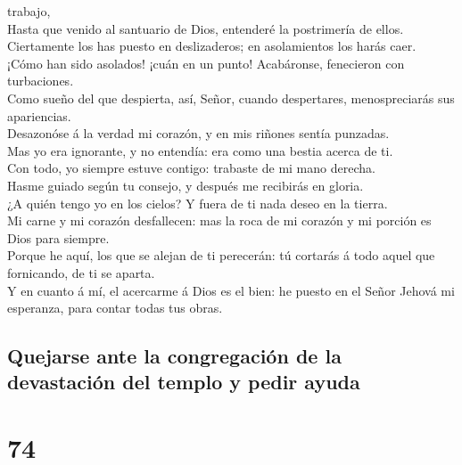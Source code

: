 trabajo,\\
 Hasta que venido al santuario de Dios, entenderé la
postrimería de ellos.\\
 Ciertamente los has puesto en deslizaderos; en
asolamientos los harás caer.\\
 ¡Cómo han sido asolados! ¡cuán en un punto! Acabáronse,
fenecieron con turbaciones.\\
 Como sueño del que despierta, así, Señor, cuando
despertares, menospreciarás sus apariencias.\\
 Desazonóse á la verdad mi corazón, y en mis riñones
sentía punzadas.\\
 Mas yo era ignorante, y no entendía: era como una bestia
acerca de ti.\\
 Con todo, yo siempre estuve contigo: trabaste de mi mano
derecha.\\
 Hasme guiado según tu consejo, y después me recibirás en
gloria.\\
 ¿A quién tengo yo en los cielos? Y fuera de ti nada
deseo en la tierra.\\
 Mi carne y mi corazón desfallecen: mas la roca de mi
corazón y mi porción es Dios para siempre.\\
 Porque he aquí, los que se alejan de ti perecerán: tú
cortarás á todo aquel que fornicando, de ti se aparta.\\
 Y en cuanto á mí, el acercarme á Dios es el bien: he
puesto en el Señor Jehová mi esperanza, para contar todas tus obras.

\hypertarget{quejarse-ante-la-congregaciuxf3n-de-la-devastaciuxf3n-del-templo-y-pedir-ayuda}{%
\subsection{Quejarse ante la congregación de la devastación del templo y
pedir
ayuda}\label{quejarse-ante-la-congregaciuxf3n-de-la-devastaciuxf3n-del-templo-y-pedir-ayuda}}

\hypertarget{section-19-74}{%
\section{74}\label{section-19-74}}

